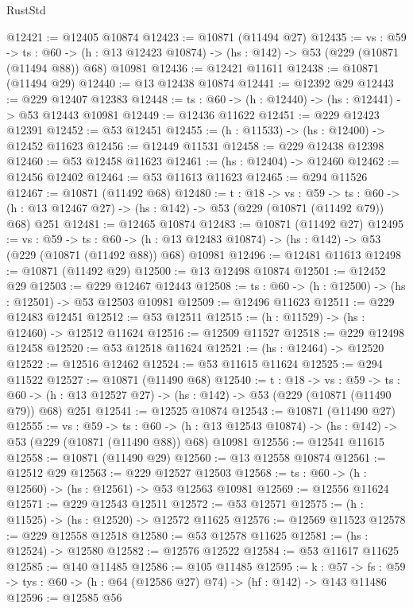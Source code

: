 \begin{lexlean}{RustStd}
\begin{coremodule}
@12421 := @12405 @10874
@12423 := @10871 (@11494 @27)
@12435 := {vs : @59} ->
  {ts : @60} ->
  (h : @13 @12423 @10874) -> (hs : @142) -> @53 (@229 (@10871 (@11494 @88)) @68) @10981
@12436 := @12421 @11611
@12438 := @10871 (@11494 @29)
@12440 := @13 @12438 @10874
@12441 := @12392 @29
@12443 := @229 @12407 @12383
@12448 := {ts : @60} -> (h : @12440) -> (hs : @12441) -> @53 @12443 @10981
@12449 := @12436 @11622
@12451 := @229 @12423 @12391
@12452 := @53 @12451
@12455 := (h : @11533) -> (hs : @12400) -> @12452 @11623
@12456 := @12449 @11531
@12458 := @229 @12438 @12398
@12460 := @53 @12458 @11623
@12461 := (hs : @12404) -> @12460
@12462 := @12456 @12402
@12464 := @53 @11613 @11623
@12465 := @294 @11526
@12467 := @10871 (@11492 @68)
@12480 := {t : @18} ->
  {vs : @59} ->
  {ts : @60} -> (h : @13 @12467 @27) -> (hs : @142) -> @53 (@229 (@10871 (@11492 @79)) @68) @251
@12481 := @12465 @10874
@12483 := @10871 (@11492 @27)
@12495 := {vs : @59} ->
  {ts : @60} ->
  (h : @13 @12483 @10874) -> (hs : @142) -> @53 (@229 (@10871 (@11492 @88)) @68) @10981
@12496 := @12481 @11613
@12498 := @10871 (@11492 @29)
@12500 := @13 @12498 @10874
@12501 := @12452 @29
@12503 := @229 @12467 @12443
@12508 := {ts : @60} -> (h : @12500) -> (hs : @12501) -> @53 @12503 @10981
@12509 := @12496 @11623
@12511 := @229 @12483 @12451
@12512 := @53 @12511
@12515 := (h : @11529) -> (hs : @12460) -> @12512 @11624
@12516 := @12509 @11527
@12518 := @229 @12498 @12458
@12520 := @53 @12518 @11624
@12521 := (hs : @12464) -> @12520
@12522 := @12516 @12462
@12524 := @53 @11615 @11624
@12525 := @294 @11522
@12527 := @10871 (@11490 @68)
@12540 := {t : @18} ->
  {vs : @59} ->
  {ts : @60} -> (h : @13 @12527 @27) -> (hs : @142) -> @53 (@229 (@10871 (@11490 @79)) @68) @251
@12541 := @12525 @10874
@12543 := @10871 (@11490 @27)
@12555 := {vs : @59} ->
  {ts : @60} ->
  (h : @13 @12543 @10874) -> (hs : @142) -> @53 (@229 (@10871 (@11490 @88)) @68) @10981
@12556 := @12541 @11615
@12558 := @10871 (@11490 @29)
@12560 := @13 @12558 @10874
@12561 := @12512 @29
@12563 := @229 @12527 @12503
@12568 := {ts : @60} -> (h : @12560) -> (hs : @12561) -> @53 @12563 @10981
@12569 := @12556 @11624
@12571 := @229 @12543 @12511
@12572 := @53 @12571
@12575 := (h : @11525) -> (hs : @12520) -> @12572 @11625
@12576 := @12569 @11523
@12578 := @229 @12558 @12518
@12580 := @53 @12578 @11625
@12581 := (hs : @12524) -> @12580
@12582 := @12576 @12522
@12584 := @53 @11617 @11625
@12585 := @140 @11485
@12586 := @105 @11485
@12595 := {k : @57} ->
  {fs : @59} -> {tys : @60} -> (h : @64 (@12586 @27) @74) -> (hf : @142) -> @143 @11486
@12596 := @12585 @56

\end{coremodule}
\end{lexlean}
